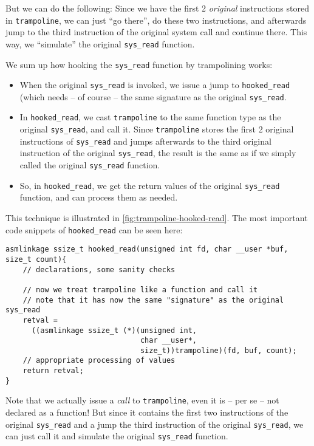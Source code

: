 \documentclass[10pt, letterpaper]{scrartcl}
\begin{document}
But we can do the following: Since we have the first 2 \emph{original} instructions stored in \texttt{trampoline}, we can just ``go there'', do these two instructions, and afterwards jump to the third instruction of the original system call and continue there. This way, we ``simulate'' the original \texttt{sys\_read} function.

We sum up how hooking the \texttt{sys\_read} function by trampolining works:

\begin{itemize}
\item When the original \texttt{sys\_read} is invoked, we issue a jump to \texttt{hooked\_read} (which needs -- of course -- the same signature as the original \texttt{sys\_read}.
\item In \texttt{hooked\_read}, we cast \texttt{trampoline} to the same function type as the original \texttt{sys\_read}, and call it. Since \texttt{trampoline} stores the first 2 original instructions of \texttt{sys\_read} and jumps afterwards to the third original instruction of the original \texttt{sys\_read}, the result is the same as if we simply called the original \texttt{sys\_read} function.
\item So, in \texttt{hooked\_read}, we get the return values of the original \texttt{sys\_read} function, and can process them as needed.
\end{itemize}

This technique is illustrated in \autoref{fig:trampoline-hooked-read}. The most important code snippets of \texttt{hooked\_read} can be seen here:

\begin{verbatim}
asmlinkage ssize_t hooked_read(unsigned int fd, char __user *buf, size_t count){
    // declarations, some sanity checks

    // now we treat trampoline like a function and call it
    // note that it has now the same "signature" as the original sys_read
    retval = 
      ((asmlinkage ssize_t (*)(unsigned int, 
                               char __user*,
                               size_t))trampoline)(fd, buf, count);
    // appropriate processing of values
    return retval;
}
\end{verbatim}

Note that we actually issue a \emph{call} to \texttt{trampoline}, even it is -- per se -- not declared as a function! But since it contains the first two instructions of the original \texttt{sys\_read} and a jump the third instruction of the original \texttt{sys\_read}, we can just call it and simulate the original \texttt{sys\_read} function.
\end{document}
